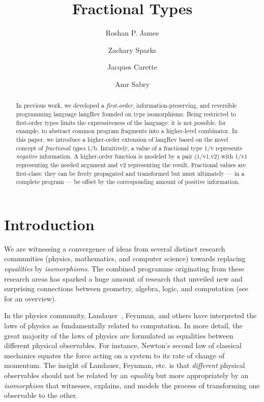 \documentclass{llncs}
\begin{document}
\title{Fractional Types}
\author{Roshan P. James \and Zachary Sparks \and Jacques Carette \and Amr Sabry}
\institute{}
\maketitle

\begin{abstract}
  In previous work, we developed a \emph{first-order},
  information-preserving, and reversible programming language {{langRev}}
  founded on type isomorphisms. Being restricted to first-order types limits
  the expressiveness of the language: it is not possible, for example, to
  abstract common program fragments into a higher-level combinator. In this
  paper, we introduce a higher-order extension of {{langRev}} based on the
  novel concept of \emph{fractional types} {{1/b}}. Intuitively, a value of a
  fractional type {{1/v}} represents \emph{negative} information. A
  higher-order function is modeled by a pair {{(1/v1,v2)}} with {{1/v1}}
  representing the needed argument and {{v2}} representing the
  result. Fractional values are first-class: they can be freely propagated
  and transformed but must ultimately --- in a complete program --- be offset
  by the corresponding amount of positive information.
\end{abstract}

\section{Introduction} 

We are witnessing a convergence of ideas from several distinct research
communities (physics, mathematics, and computer science) towards replacing
\emph{equalities} by \emph{isomorphisms}. The combined programme originating
from these research areas has sparked a huge amount of research that unveiled
new and surprising connections between geometry, algebra, logic, and
computation (see~\cite{baez2011physics} for an overview).

In the physics community, Landauer~\cite{Landauer:1961}, Feynman, and others
have interpreted the laws of physics as fundamentally related to
computation. In more detail, the great majority of the laws of physics are
formulated as equalities between different physical observables. For
instance, Newton's second law of classical mechanics equates the force acting
on a system to its rate of change of momentum. The insight of Landauer,
Feynman, etc. is that \emph{different} physical observables should not be
related by an \emph{equality} but more appropriately by an \emph{isomorphism}
that witnesses, explains, and models the process of transforming one
observable to the other.
\end{document}
